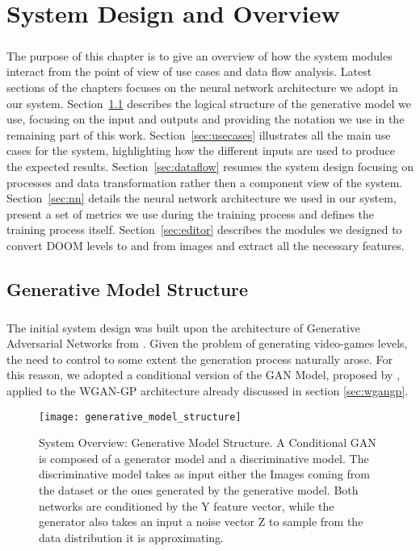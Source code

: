 \chapter{System Design and Overview}
\label{ch:system_design}
\paragraph{}
 The purpose of this chapter is to give an overview of how the system modules interact from the point of view of use cases and data flow analysis. Latest sections of the chapters focuses on the neural network architecture we adopt in our system. Section~\ref{sec:modelstructure} describes the logical structure of the generative model we use, focusing on the input and outputs and providing the notation we use in the remaining part of this work.
 Section~\ref{sec:usecases} illustrates all the main use cases for the system, highlighting how the different inputs are used to produce the expected results.
 Section~\ref{sec:dataflow} resumes the system design focusing on processes and data transformation rather then a component view of the system.
 Section~\ref{sec:nn} details the neural network architecture we used in our system, present a set of metrics we use during the training process and defines the training process itself.
  Section~\ref{sec:editor} describes the modules we designed to convert DOOM levels to and from images and extract all the necessary features.  


\section{Generative Model Structure}
\label{sec:modelstructure}
\paragraph{} The initial system design was built upon the architecture of Generative Adversarial Networks \cite{gan} from \citeauthor{gan}. Given the problem of generating video-games levels, the need to control to some extent the generation process naturally arose. For this reason, we adopted a conditional version \cite{conditionalgan} of the GAN Model, proposed by \citeauthor{conditionalgan}, applied to the WGAN-GP architecture already discussed in section \ref{sec:wgangp}.


\begin{figure}[h!]
	\begin{center}
		\texttt{[image: generative\_model\_structure]}
	\end{center}
	
	\captionsetup{width=\linewidth}
	\caption[System Overview: Generative Model Structure]{ System Overview: Generative Model Structure. A Conditional GAN is composed of a generator model and a discriminative model. The discriminative model takes as input either the Images coming from the dataset or the ones generated by the generative model. Both networks are conditioned by the Y feature vector, while the generator also takes an input a noise vector Z to sample from the data distribution it is approximating. }
	\label{fig:genmodelstructure}
\end{figure}


